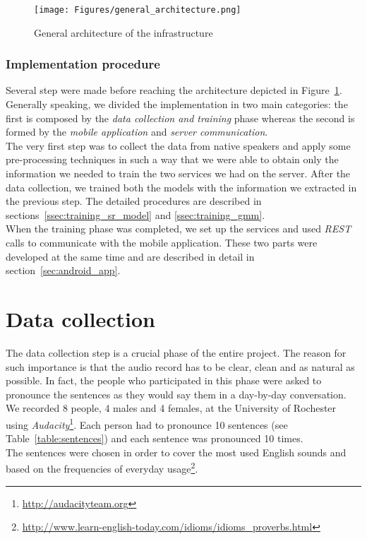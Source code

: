 \begin{figure}[!ht]
	\centering
	\texttt{[image: Figures/general\_architecture.png]}
	\caption{General architecture of the infrastructure}
	\label{fig:general_architecture}
\end{figure}

\subsubsection{Implementation procedure}
\label{ssec:procedure}

Several step were made before reaching the architecture depicted in Figure~\ref{fig:general_architecture}. Generally speaking, we divided the implementation in two main categories: the first is composed by the \textit{data collection and training} phase whereas the second is formed by the \textit{mobile application} and \textit{server communication}. \\

\noindent The very first step was to collect the data from native speakers and apply some pre-processing techniques in such a way that we were able to obtain only the information we needed to train the two services we had on the server. After the data collection, we trained both the models with the information we extracted in the previous step. The detailed procedures are described in sections~\ref{ssec:training_sr_model} and \ref{ssec:training_gmm}. \\
\noindent When the training phase was completed, we set up the services and used \textit{REST} calls to communicate with the mobile application. These two parts were developed at the same time and are described in detail in section~\ref{sec:android_app}.


\section{Data collection}
\label{sec:data_collection}

The data collection step is a crucial phase of the entire project. The reason for such importance is that the audio record has to be clear, clean and as natural as possible. In fact, the people who participated in this phase were asked to pronounce the sentences as they would say them in a day-by-day conversation. \\

\noindent We recorded 8 people, 4 males and 4 females, at the University of Rochester using \textit{Audacity}\footnote{\url{http://audacityteam.org}}. Each person had to pronounce 10 sentences (see Table~\ref{table:sentences}) and each sentence was pronounced 10 times. \\
\noindent The sentences were chosen in order to cover the most used English sounds and based on the frequencies of everyday usage\footnote{\url{http://www.learn-english-today.com/idioms/idioms_proverbs.html}}.

